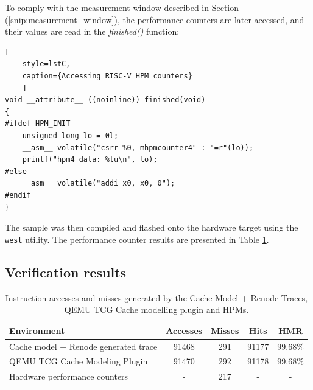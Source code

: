 \noindent To comply with the measurement window described in Section (\ref{snip:measurement_window}), the performance counters are later accessed, and their values are read in the
\textit{finished()} function:

\begin{center}
\centering
\begin{minipage}{\linewidth}
\begin{lstlisting}[
	style=lstC,
    caption={Accessing RISC-V HPM counters}
    ]
void __attribute__ ((noinline)) finished(void)
{
#ifdef HPM_INIT
	unsigned long lo = 0l;
	__asm__ volatile("csrr %0, mhpmcounter4" : "=r"(lo));
	printf("hpm4 data: %lu\n", lo);
#else
	__asm__ volatile("addi x0, x0, 0");
#endif
}
\end{lstlisting}
\end{minipage}
\end{center}

\noindent The sample was then compiled and flashed onto the hardware target using the \texttt{west} utility. The performance counter results are presented in Table \ref{table:cache_results}.

\subsection{Verification results}

\begin{center}
\begin{table}[h!]
\centering
\begin{tabular}{|l|c|c|c|c|}
\hline
\textbf{Environment} & \textbf{Accesses} & \textbf{Misses} & \textbf{Hits} & \textbf{HMR} \\ \hline
Cache model + Renode generated trace    & 91468        & 291         & 91177 & 99.68\%    \\ \hline
QEMU TCG Cache Modeling Plugin          & 91470        & 292         & 91178 & 99.68\%    \\ \hline
Hardware performance counters           & -            & 217         & - & -			  \\ \hline %
\end{tabular}
\caption{Instruction accesses and misses generated by the Cache Model + Renode Traces, QEMU TCG Cache modelling plugin and HPMs.}
\label{table:cache_results}
\end{table}
\end{center}

